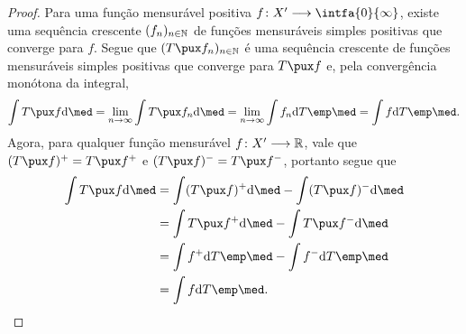 \begin{proof}
Para uma função mensurável positiva $f\colon X' \to \intfa{0}{\infty}$, existe uma sequência crescente $(f_n)_{n \in \mathbb{N}}$ de funções mensuráveis simples positivas que converge para $f$. Segue que $(T\pux f_n)_{n \in \N}$ é uma sequência crescente de funções mensuráveis simples positivas que converge para $T\pux f$ e, pela convergência monótona da integral,
	\begin{equation*}
	\int T\pux f \dd\med = \lim_{n \conv \infty} \int T\pux f_n \dd \med  = \lim_{n \conv \infty} \int f_n \dd T\emp \med = \int f \dd T\emp\med.
	\end{equation*}
Agora, para qualquer função mensurável $f\colon X' \longrightarrow \mathbb{R}$, vale que $(T\pux f)^+ = T\pux f^+$ e $(T\pux f)^- = T\pux f^-$, portanto segue que
	\begin{align*}
	\int T\pux f \dd\med &= \int (T\pux f)^+ \dd\med - \int (T\pux f)^- \dd\med \\
		&= \int T\pux f^+ \dd\med - \int T\pux f^- \dd\med \\
		&= \int f^+ \dd T\emp \med - \int f^- \dd T\emp \med \\
		&= \int f \dd T\emp\med.
	\end{align*}
\end{proof}

